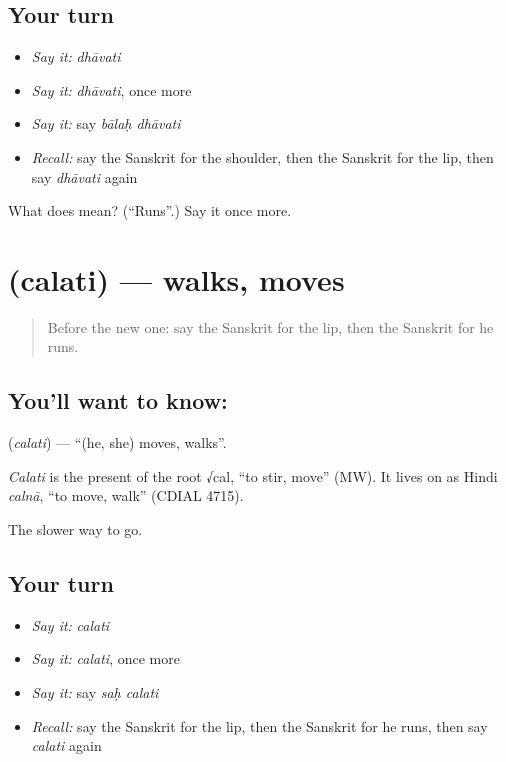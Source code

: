 \subsection*{Your turn}
\begin{itemize}
\raggedright
  \item \emph{Say it:} \emph{dhāvati}
  \item \emph{Say it:} \emph{dhāvati}, once more
  \item \emph{Say it:} say \emph{bālaḥ dhāvati}
  \item \emph{Recall:} say the Sanskrit for the shoulder, then the Sanskrit for the lip, then say \emph{dhāvati} again
\end{itemize}

\begin{tcolorbox}[breakable,colback=teal!4,colframe=teal!35!black,title={Before you move on}]
What does  mean? (\textquotedblleft{}Runs\textquotedblright{}.) Say it once more.
\end{tcolorbox}
\section[\texorpdfstring{\sk{चलति} (calati)}{चलति (calati)}]{ (calati) — walks, moves}

\label{lesson:SA-C71-walks}



\begin{quote}
Before the new one: say the Sanskrit for the lip, then the Sanskrit for he runs.
\end{quote}

\subsection*{You'll want to know: }
\textbf{} (\emph{calati}) — \textquotedblleft{}(he, she) moves, walks\textquotedblright{}.

\begin{cousinweb}
\emph{Calati} is the present of the root √cal, \textquotedblleft{}to stir, move\textquotedblright{} (MW). It lives on as Hindi \emph{calnā}, \textquotedblleft{}to move, walk\textquotedblright{} (CDIAL 4715).
\end{cousinweb}

\begin{grammarlens}[title={What you've built}]
The slower way to go.
\end{grammarlens}

\subsection*{Your turn}
\begin{itemize}
\raggedright
  \item \emph{Say it:} \emph{calati}
  \item \emph{Say it:} \emph{calati}, once more
  \item \emph{Say it:} say \emph{saḥ calati}
  \item \emph{Recall:} say the Sanskrit for the lip, then the Sanskrit for he runs, then say \emph{calati} again
\end{itemize}

